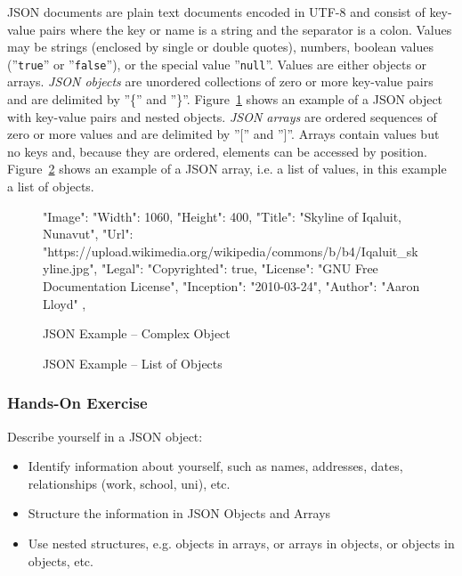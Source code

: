 JSON documents are plain text documents encoded in UTF-8 and consist of key-value pairs where the key or name is a string and the separator is a colon. Values may be strings (enclosed by single or double quotes), numbers, boolean values (''\texttt{true}'' or ''\texttt{false}''), or the special value ''\texttt{null}''. Values are either objects or arrays. \emph{JSON objects} are unordered collections of zero or more key-value pairs and are delimited by ''\{'' and ''\}''. Figure~\ref{fig:json1} shows an example of a JSON object with key-value pairs and nested objects. \emph{JSON arrays} are ordered sequences of zero or more values and are delimited by ''['' and '']''. Arrays contain values but no keys and, because they are ordered, elements can be accessed by position. Figure~\ref{fig:jason2} shows an example of a JSON array, i.e. a list of values, in this example a list of objects.

\begin{figure}[h]
\begin{jsoncode}
{
  "Image": {
    "Width": 1060,
    "Height": 400,
    "Title": "Skyline of Iqaluit, Nunavut",
    "Url": 
"https://upload.wikimedia.org/wikipedia/commons/b/b4/Iqaluit_skyline.jpg",
    "Legal": {
      "Copyrighted": true,
      "License": "GNU Free Documentation License",
      "Inception": "2010-03-24",
      "Author": "Aaron Lloyd"
     },
  }
}
\end{jsoncode}
\caption{JSON Example -- Complex Object}
\label{fig:json1}
\end{figure}

\begin{figure}
\begin{jsoncode}
\end{jsoncode}
\caption{JSON Example -- List of Objects}
\label{fig:jason2}
\end{figure}

\begin{tcolorbox}[colback=code]
\subsubsection*{Hands-On Exercise} 

Describe yourself in a JSON object:
\begin{itemize}
	\item Identify information about yourself, such as names, addresses, dates, relationships (work, school, uni), etc.
	\item Structure the information in JSON Objects and Arrays 
	\item Use nested structures, e.g. objects in arrays, or arrays in objects, or objects in objects, etc.
\end{itemize}
\end{tcolorbox}

